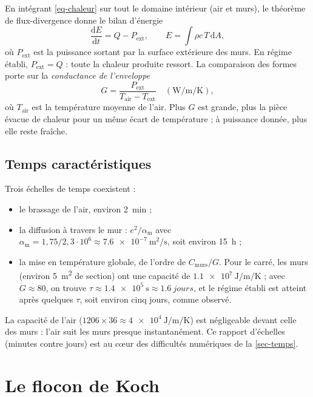 \documentclass[11pt,a4paper]{article}
\theoremstyle{definition}
\theoremstyle{remark}
\newcommand{\Text}{T_{\mathrm{ext}}}
\newcommand{\Tair}{T_{\mathrm{air}}}
\begin{document}
En intégrant \eqref{eq-chaleur} sur tout le domaine intérieur (air et murs), le
théorème de flux-divergence donne le bilan d'énergie
\begin{equation}\label{eq-bilan}
\frac{\mathrm{d}E}{\mathrm{d}t} = Q - P_{\mathrm{ext}},
\qquad E = \int \rho c\,T\,\mathrm{d}A,
\end{equation}
où $P_{\mathrm{ext}}$ est la puissance sortant par la surface extérieure des murs.
En régime établi, $P_{\mathrm{ext}} = Q$ : toute la chaleur produite ressort. La
comparaison des formes porte sur la \emph{conductance de l'enveloppe}
\begin{equation}\label{eq-G}
G = \frac{P_{\mathrm{ext}}}{\Tair - \Text}\quad(\unit{\watt\per\metre\per\kelvin}),
\end{equation}
où $\Tair$ est la température moyenne de l'air. Plus $G$ est grande, plus la pièce
évacue de chaleur pour un même écart de température ; à puissance donnée, plus elle
reste fraîche.

\subsection{Temps caractéristiques}

Trois échelles de temps coexistent :
\begin{itemize}
  \item le brassage de l'air, environ \qty{2}{\minute} ;
  \item la diffusion à travers le mur : $e^2/\alpha_{\mathrm{m}}$ avec
  $\alpha_{\mathrm{m}} = 1,75/2,3\cdot 10^{6} \approx \qty{7,6e-7}{\square\metre\per\second}$,
  soit environ \qty{15}{\hour} ;
  \item la mise en température globale, de l'ordre de $C_{\mathrm{murs}}/G$. Pour le
  carré, les murs (environ \qty{5}{\square\metre} de section) ont une capacité de
  $\qty{1,1e7}{\joule\per\metre\per\kelvin}$ ; avec $G \approx 80$, on trouve
  $\tau \approx \qty{1,4e5}{\second} \approx \qty{1,6}{jours}$, et le régime établi
  est atteint après quelques $\tau$, soit environ cinq jours, comme observé.
\end{itemize}
La capacité de l'air ($1206 \times 36 \approx \qty{4e4}{\joule\per\metre\per\kelvin}$)
est négligeable devant celle des murs : l'air suit les murs presque instantanément.
Ce rapport d'échelles (minutes contre jours) est au cœur des difficultés numériques
de la \cref{sec-temps}.

\section{Le flocon de Koch}\label{sec-koch}
\end{document}
